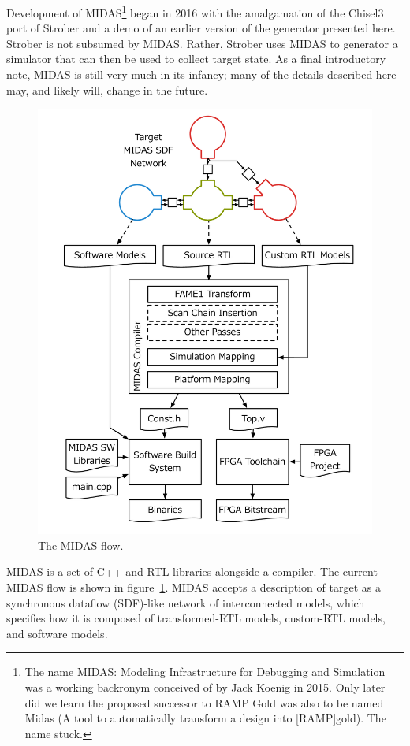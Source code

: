 Development of MIDAS\footnote{The name MIDAS: Modeling Infrastructure for
Debugging and Simulation was a working backronym conceived of by Jack Koenig in
2015. Only later did we learn the proposed successor to RAMP Gold was also to
be named Midas (A tool to automatically transform a design into [RAMP]gold).
The name stuck.} began in 2016 with the amalgamation of the Chisel3 port of
Strober and a demo of an earlier version of the generator presented here.
Strober is not subsumed by MIDAS.  Rather, Strober uses MIDAS to generator a
simulator that can then be used to collect target state.  As a final
introductory note, MIDAS is still very much in its infancy; many of the details
described here may, and likely will, change in the future.

\begin{figure}
	\centering
	\includegraphics[width=16cm]{figures/toolchain.pdf}
    \caption{The MIDAS flow.}
	\label{fig:midas}
\end{figure}

MIDAS is a set of C++ and RTL libraries alongside a compiler. The current MIDAS
flow is shown in figure~\ref{fig:midas}. MIDAS accepts a description of target
as a synchronous dataflow (SDF)-like network of interconnected models, which
specifies how it is composed of transformed-RTL models, custom-RTL models, and
software models.

